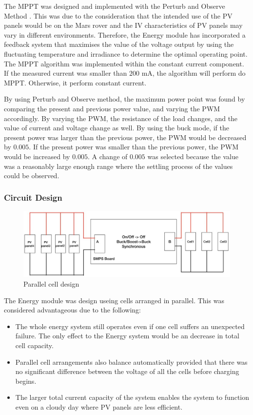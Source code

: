 \documentclass[11pt, a4paper]{article}
\begin{document}
The MPPT was designed and implemented with the Perturb and Observe Method \cite{PV_current}. This was due to the consideration that the intended use of the PV panels would be on the Mars rover and the IV characteristics of PV panels may vary in different environments. Therefore, the Energy module has incorporated a feedback system that maximises the value of the voltage output by using the fluctuating temperature and irradiance to determine the optimal operating point. The MPPT algorithm was implemented within the constant current component. If the measured current was smaller than $200$ mA, the algorithm will perform do MPPT. Otherwise, it perform constant current.

By using Perturb and Observe method, the maximum power point was found by comparing the present and previous power value, and varying the PWM accordingly. By varying the PWM, the resistance of the load changes, and the value of current and voltage change as well. By using the buck mode, if the present power was larger than the previous power, the PWM would be decreased by $0.005$. If the present power was smaller than the previous power, the PWM would be increased by $0.005$. A change of $0.005$ was selected because the value was a reasonably large enough range where the settling process of the values could be observed.

\pagebreak
\subsubsection{Circuit Design}

\begin{figure} [h!]
    \centering
    \includegraphics[scale=0.5]{Energy_parallel.JPG}
    \caption{Parallel cell design}
\end{figure}
The Energy module was design useing cells arranged in parallel. This was considered advantageous due to the following:
\begin{itemize}
    \item The whole energy system still operates even if one cell suffers an unexpected failure. The only effect to the Energy system would be an decrease in total cell capacity.
    \item Parallel cell arrangements also balance automatically provided that there was no significant difference between the voltage of all the cells before charging begins.
    \item The larger total current capacity of the system enables the system to function even on a cloudy day where PV panels are less efficient.
\end{itemize}
\end{document}
